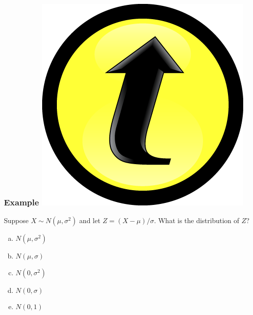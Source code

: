 \documentclass[handout]{beamer}
\begin{document}
\begin{frame}
\frametitle{Example \hfill \includegraphics[scale = 0.05]{./images/clicker}}
Suppose $X \sim N(\mu, \sigma^2)$ and let $Z = (X -\mu)/\sigma$. What is the distribution of $Z$?

\begin{enumerate}[(a)]
	\item $N(\mu, \sigma^2)$
	\item $N(\mu, \sigma)$
	\item $N(0, \sigma^2)$
	\item  $N(0, \sigma)$
	\item $N(0,1)$
\end{enumerate}
\end{frame}
\end{document}
